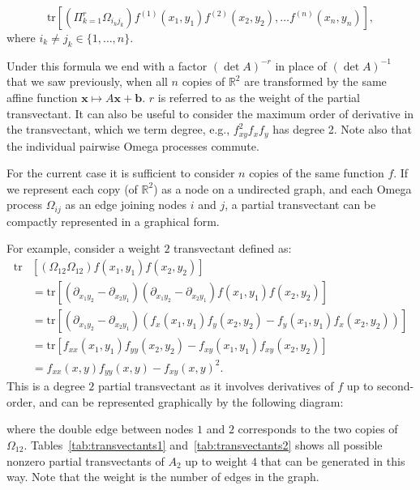 \documentclass[review,onefignum,onetabnum]{siamonline190516}
\begin{document}
{\begin{equation}
\mbox{tr} \left[\left( \Pi_{k=1}^r \Omega_{i_k j_k} \right) f^{(1)}(x_1, y_1)
f^{(2)}(x_2, y_2), \ldots f^{(n)} (x_n, y_n)\right],
\end{equation}
where $i_k \neq j_k \in \{1, \ldots, n\}$.

Under this formula we end with a factor $(\det A)^{-r}$ in place of $(\det
A)^{-1}$ that we saw previously, when all $n$ copies of $\mathbb{R}^2$ are
transformed by the same affine function $\mathbf{x} \mapsto A\mathbf{x} +
\mathbf{b}$. $r$ is referred to as the weight of the partial
transvectant. It can also be useful to consider the maximum order of
derivative in the transvectant, which we term degree, e.g., $f_{xy}^2 f_x
f_y$ has degree 2. Note also that the individual pairwise Omega processes commute.

For the current case it is sufficient to consider $n$ copies of the same
function $f$. If we represent each copy (of $\mathbb{R}^2$) as a node on a
undirected graph, and each Omega process $\Omega_{ij}$ as an edge joining
nodes $i$ and $j$, a partial transvectant can be compactly represented in a
graphical form. 

For example, consider a weight $2$ transvectant defined as:
\begin{align*}
    \mbox{tr} &\left[(\Omega_{12}\Omega_{12}) f(x_1, y_1)f(x_2, y_2)\right] \\
    &= \mbox{tr}\left[(\partial_{x_1 y_2} - \partial_{x_2y_1})(\partial_{x_1 y_2} -
    \partial_{x_2y_1})f(x_1, y_1)f(x_2, y_2)\right]\\
    &= \mbox{tr}\left[\left(\partial_{x_1 y_2} - \partial_{x_2 y_1}\right)\left(f_x(x_1, y_1)f_y(x_2, y_2) - f_y(x_1, y_1)f_x(x_2, y_2)\right)\right] \\
    &= \mbox{tr}\left[f_{xx}(x_1, y_1)f_{yy}(x_2, y_2) - f_{xy}(x_1, y_1)f_{xy}(x_2, y_2)\right] \\
    &= f_{xx}(x, y) f_{yy}(x, y) - f_{xy}(x, y)^2.
\end{align*}
This is a degree $2$ partial transvectant as it involves derivatives of $f$
up to second-order, and can be represented graphically by the following
diagram:
\begin{center}
\end{center}
where the double edge between nodes $1$ and $2$ corresponds to the two copies of $\Omega_{12}$.
Tables~\ref{tab:transvectants1} and~\ref{tab:transvectants2} shows all possible nonzero partial
transvectants of $A_2$ up to weight $4$ that can be generated in this way.
Note that the weight is the number of edges in the graph.

}
\end{document}
